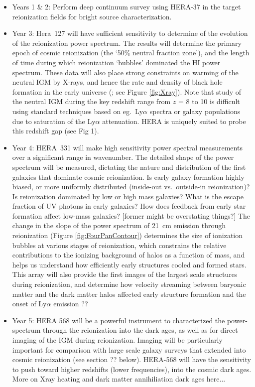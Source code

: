 \documentclass[preprint]{aastex}
\begin{document}
\begin{itemize}

\item Years 1 \& 2: Perform deep continuum survey using HERA-37 in the target reionization fields for bright source characterization. 

\item Year 3: Hera~127 will have sufficient sensitivity to determine of the evolution of the reionization power spectrum. The results will determine the primary epoch of cosmic reionization (the `50\% neutral fraction zone'), and the length of time during which reionization `bubbles' dominated the HI power spectrum. These data will also place strong constraints on warming of the neutral IGM by X-rays, and hence the rate and density of black hole formation in the
early universe (\citealt{pritchard_XXX}; see Figure \ref{fig:Xray}). Note that study of the neutral IGM during the key redshift range from $z$ = 8 to 10 is difficult using standard techniques based on eg.\ Ly$\alpha$ spectra or galaxy populations due to saturation of the Ly$\alpha$ attenuation. HERA is uniquely suited to probe this redshift gap (see Fig 1). 

\item Year 4: HERA~331 will make high sensitivity power spectral measurements over a significant range in wavenumber. The detailed shape of the power spectrum will be measured, dictating the nature and distribution of the first galaxies that dominate cosmic  reionization. Is early galaxy formation highly biased, or more uniformly distributed (inside-out vs.\ outside-in reionization)? Is reionization dominated by low or high mass galaxies? What is the escape fraction of UV photons in early galaxies? How does feedback from early star formation affect low-mass galaxies? [former might be overstating things?] The change in the slope of the power spectrum of 21~cm emission through reionization (Figure \ref{fig:FourPanContour}) determines the size of ionization bubbles at various stages of reionization, which constrains the relative contributions to the ionizing background of halos as a function of mass, and helps us understand how efficiently early structures cooled and formed stars. This array will also provide the first images of the largest scale structures during reionization, and determine how velocity streaming between baryonic  matter and the dark matter halos affected early structure formation and the onset of Ly$\alpha$ emission \citep{visbal_et_al2012}??

\item Year 5: HERA 568 will be a powerful instrument to characterized the power-spectrum through the reionization into the dark ages, as well as for direct imaging of the IGM during reionization. Imaging will be particularly important for comparison with large scale galaxy surveys that extended into cosmic reionization (see section ?? below). HERA-568 will have the sensitivity to push toward higher redshifts (lower frequencies), into the cosmic dark ages. More on Xray heating and dark matter annihiliation dark ages here...

\end{itemize}
\end{document}

